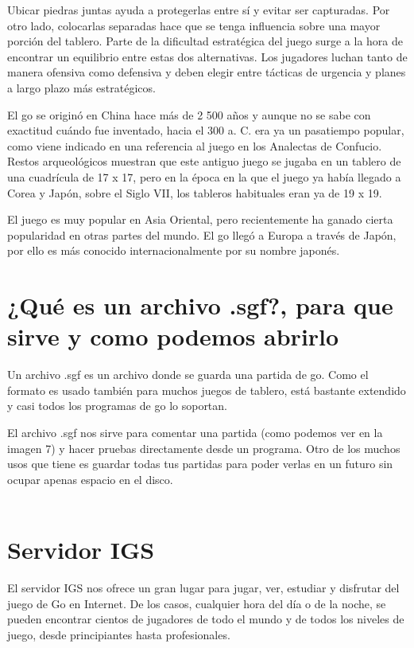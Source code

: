 \documentclass[12pt,a4paper]{report}
\begin{document}
Ubicar piedras juntas ayuda a protegerlas entre sí y evitar ser capturadas. Por otro lado, colocarlas separadas hace que se tenga influencia sobre una mayor porción del tablero. Parte de la dificultad estratégica del juego surge a la hora de encontrar un equilibrio entre estas dos alternativas. Los jugadores luchan tanto de manera ofensiva como defensiva y deben elegir entre tácticas de urgencia y planes a largo plazo más estratégicos.

El go se originó en China hace más de 2 500 años y aunque no se sabe con exactitud cuándo fue inventado, hacia el 300 a. C. era ya un pasatiempo popular, como viene indicado en una referencia al juego en los Analectas de Confucio. Restos arqueológicos muestran que este antiguo juego se jugaba en un tablero de una cuadrícula de 17 x 17, pero en la época en la que el juego ya había llegado a Corea y Japón, sobre el Siglo VII, los tableros habituales eran ya de 19 x 19.

El juego es muy popular en Asia Oriental, pero recientemente ha ganado cierta popularidad en otras partes del mundo. El go llegó a Europa a través de Japón, por ello es más conocido internacionalmente por su nombre japonés.





\section{¿Qué es un archivo .sgf?, para que sirve y como podemos abrirlo}\label{sgf}
Un archivo .sgf es un archivo donde se guarda una partida de go. Como el formato es usado también para muchos juegos de tablero, está bastante extendido y casi todos los programas de go lo soportan.


El archivo .sgf nos sirve para comentar una partida (como podemos ver en la imagen 7) y hacer pruebas directamente desde un programa. Otro de los muchos usos que tiene es guardar todas tus partidas para poder verlas en un futuro sin ocupar apenas espacio en el disco. \\ \\

\section{Servidor IGS}
El servidor IGS nos ofrece un gran lugar para jugar, ver, estudiar y disfrutar del juego de Go en Internet. De los casos, cualquier hora del día o de la noche, se pueden encontrar cientos de jugadores de todo el mundo y de todos los niveles de juego, desde principiantes hasta profesionales. 
\end{document}

